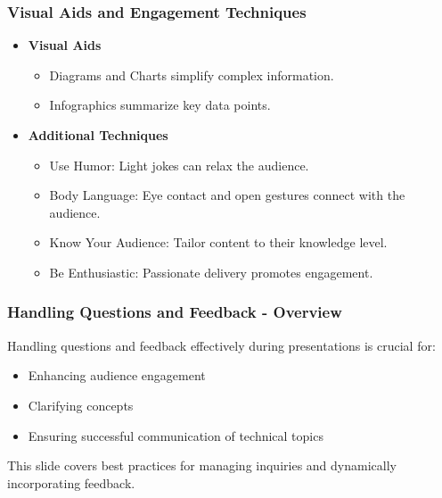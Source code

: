 \documentclass[aspectratio=169]{beamer}
\begin{document}
\begin{frame}[fragile]
  \frametitle{Visual Aids and Engagement Techniques}
  \begin{itemize}
    \item \textbf{Visual Aids}
      \begin{itemize}
        \item Diagrams and Charts simplify complex information.
        \item Infographics summarize key data points.
      \end{itemize}
    \item \textbf{Additional Techniques}
      \begin{itemize}
        \item Use Humor: Light jokes can relax the audience.
        \item Body Language: Eye contact and open gestures connect with the audience.
        \item Know Your Audience: Tailor content to their knowledge level.
        \item Be Enthusiastic: Passionate delivery promotes engagement.
      \end{itemize}
  \end{itemize}
\end{frame}

\begin{frame}[fragile]
  \frametitle{Handling Questions and Feedback - Overview}
  Handling questions and feedback effectively during presentations is crucial for:
  \begin{itemize}
    \item Enhancing audience engagement
    \item Clarifying concepts
    \item Ensuring successful communication of technical topics
  \end{itemize}
  This slide covers best practices for managing inquiries and dynamically incorporating feedback.
\end{frame}
\end{document}
